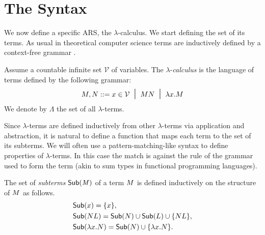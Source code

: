\section{The Syntax}
We now define a specific ARS, the $\lambda$-calculus. We start defining the set of its terms. As usual in theoretical computer science terms are inductively defined by a context-free grammar \cite{backus_syntax_1959}.
\begin{definition}
	Assume a countable infinite set $\mathcal{V}$ of variables. The
	$\lambda$-\emph{calculus} is the language of terms defined by
	the following grammar:
	$$
	M,N::=x\in\mathcal{V}\; \; \mbox{\Large{$\mid$}}\;\;MN\; \; \mbox{\Large{$\mid$}}\;\;\lambda x.M
	$$
	We denote by $\Lambda$ the set of all $\lambda$-terms.
\end{definition}
Since $\lambda$-terms are defined inductively from other $\lambda$-terms via application and abstraction, it is natural to define a function that maps each term to the set of its subterms. We will often use a pattern-matching-like syntax to define properties of $\lambda$-terms. In this case the match is against the rule of the grammar used to form the term (akin to sum types in functional programming languages).
\begin{THESIS}
	\begin{definition}
		The set of \emph{subterms} $\mathsf{Sub(\mathit{M})}$ of a term $M$ is defined inductively on the structure of $M$ as follows.
		\begin{align*}
		&\mathsf{Sub}(x)=\{x\},\\
		&\mathsf{Sub}(NL)=\mathsf{Sub}(N)\cup \mathsf{Sub}(L)\cup\{NL\},\\
		&\mathsf{Sub}(\lambda x.N)=\mathsf{Sub}(N)\cup \{\lambda x.N\}.
		\end{align*}
	\end{definition}
\end{THESIS}
